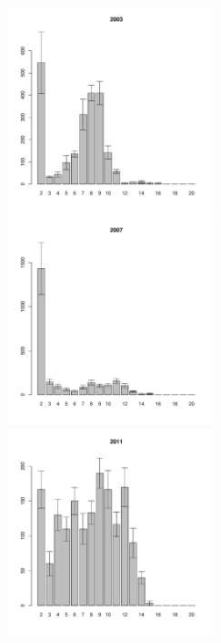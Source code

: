 \begin{figure}[hp]
\begin{minipage}[b]{.3\linewidth}
\begin{center}
	\end{center}
	\end{minipage}
	\begin{minipage}[b]{.3\linewidth}
	\begin{center}
	\includegraphics[width=60mm]{../White_Sea/Estuatiy_Luvenga/sizestr2_2003_.pdf}
	\end{center}
	\end{minipage}
	\hfill
	\begin{minipage}[b]{.3\linewidth}
	\begin{center}
	\includegraphics[width=60mm]{../White_Sea/Estuatiy_Luvenga/sizestr2_2007_.pdf}
	\end{center}
	\end{minipage}
	\hfill
	\begin{minipage}[b]{.3\linewidth}
	\begin{center}
	\includegraphics[width=60mm]{../White_Sea/Estuatiy_Luvenga/sizestr2_2011_.pdf}
	\end{center}
	\end{minipage}


\end{figure}

